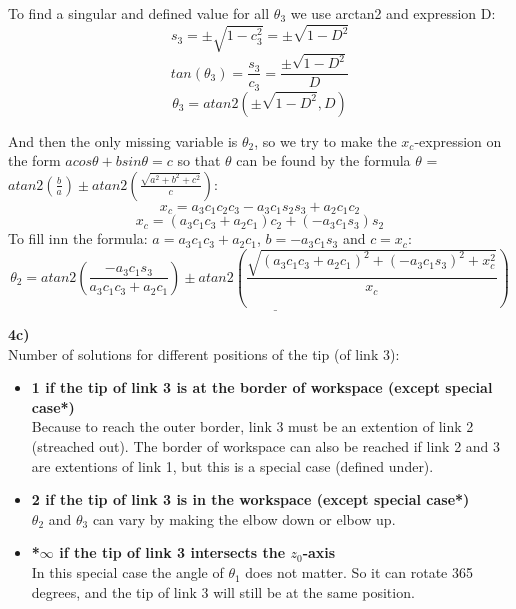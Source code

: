 \documentclass[12pt,norsk,a4paper]{article}
\begin{document}
    To find a singular and defined value for all $\theta_3$ we use arctan2 and expression D:
    \[s_3 = \pm\sqrt{1-c_3^2} = \pm\sqrt{1-D^2}\]
    \[tan(\theta_3) = \frac{s_3}{c_3} = \frac{\pm\sqrt{1-D^2}}{D}\]
    \[\theta_3 = atan2(\pm\sqrt{1-D^2}, D)\]

    And then the only missing variable is $\theta_2$, so we try to make the $x_c$-expression on the form $acos\theta+bsin\theta= c$
    so that $\theta$ can be found by the formula $\theta$ = $atan2(\frac{b}{a})\pm atan2(\frac{\sqrt{a^2+b^2+c^2}}{c})$:
    \[x_c = a_3c_1c_2c_3-a_3c_1s_2s_3+a_2c_1c_2\]
    \[x_c = (a_3c_1c_3+a_2c_1)c_2+(-a_3c_1s_3)s_2\]
    To fill inn the formula: $a = a_3c_1c_3+a_2c_1$, $b= -a_3c_1s_3$ and $c = x_c$:
    \[\theta_2 = \underline{atan2(\frac{-a_3c_1s_3}{a_3c_1c_3+a_2c_1})\pm atan2(\frac{\sqrt{(a_3c_1c_3+a_2c_1)^2+(-a_3c_1s_3)^2+x_c^2}}{x_c})}\]

    \textbf{4c)}\\
    Number of solutions for different positions of the tip (of link 3):
    \begin{itemize}
        \item \textbf{1 if the tip of link 3 is at the border of workspace (except special case*)}\\
        Because to reach the outer border, link 3 must be an extention of link 2 (streached out).
        The border of workspace can also be reached if link 2 and 3 are extentions of link 1, but this is a special case (defined under).
        \item \textbf{2 if the tip of link 3 is in the workspace (except special case*)}\\
        $\theta_2$ and $\theta_3$ can vary by making the elbow down or elbow up.
        \item \textbf{*$\infty$ if the tip of link 3 intersects the $z_0$-axis}\\
        In this special case the angle of $\theta_1$ does not matter. So it can rotate 365 degrees, 
        and the tip of link 3 will still be at the same position.
    \end{itemize}


        
\end{document}
